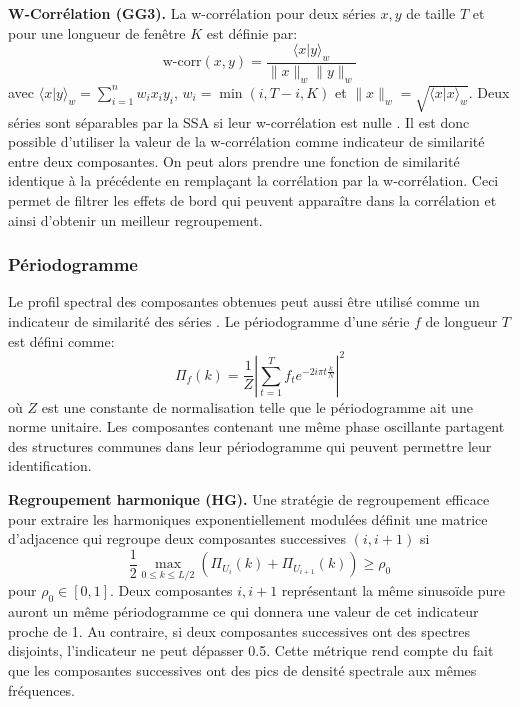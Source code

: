 \documentclass{gretsi}
\begin{document}
\textbf{W-Corrélation (GG3).}\label{par:GG3} 
    La w-corrélation pour deux séries $x, y$ de taille $T$ et pour une longueur de fenêtre $K$ est définie par:
    \begin{equation}
        \text{w-corr}(x, y) = \frac{\langle x|y\rangle_w}{\|x\|_w\|y\|_w}
    \end{equation}
    avec $\langle x|y\rangle_w = \sum_{i=1}^n w_i x_i y_i$, $w_i = \min(i, T-i, K)$ et $\|x\|_w = \sqrt{\langle x|x\rangle_w}$.
    Deux séries sont séparables par la SSA si leur w-corrélation est nulle \cite{Golyandina_10_ssa}.
    Il est donc possible d'utiliser la valeur de la w-corrélation comme indicateur de similarité entre deux composantes.
    On peut alors prendre une fonction de similarité identique à la précédente en remplaçant la corrélation par la w-corrélation.
    Ceci permet de filtrer les effets de bord qui peuvent apparaître dans la corrélation et ainsi d'obtenir un meilleur regroupement.


\subsubsection{Périodogramme}\label{ssub:per}

Le profil spectral des composantes obtenues peut aussi être utilisé comme un indicateur de similarité des séries \cite{Golyandina_10_ssa}.
Le périodogramme d'une série $f$ de longueur $T$ est défini comme:
\begin{equation}
    \Pi_f(k) = \frac{1}{Z}\left|\sum_{t=1}^T f_t e^{-2i\pi t \frac{k}{N}}\right|^2
\end{equation}
où $Z$ est une constante de normalisation telle que le périodogramme ait une norme unitaire.
Les composantes contenant une même phase oscillante partagent des structures communes dans leur périodogramme qui peuvent permettre leur identification.

\textbf{Regroupement harmonique (HG).}\label{par:HG}
    Une stratégie de regroupement efficace pour extraire les harmoniques exponentiellement modulées \cite{alexandrov_05_auto} définit une matrice d'adjacence qui regroupe deux composantes successives $(i, i+1)$ si 
    \begin{equation}
        \frac{1}{2}\max_{0\le k \le L/2}\left(\Pi_{U_i}(k) + \Pi_{U_{i+1}}(k)\right) \ge \rho_0 
    \end{equation}
    pour $\rho_0\in \left[0, 1\right]$.
    Deux composantes $i, i+1$ représentant la même sinusoïde pure auront un même périodogramme ce qui donnera une valeur de cet indicateur proche de 1.
    Au contraire, si deux composantes successives ont des spectres disjoints, l'indicateur ne peut dépasser 0.5.
    Cette métrique rend compte du fait que les composantes successives ont des pics de densité spectrale aux mêmes fréquences.
\end{document}
